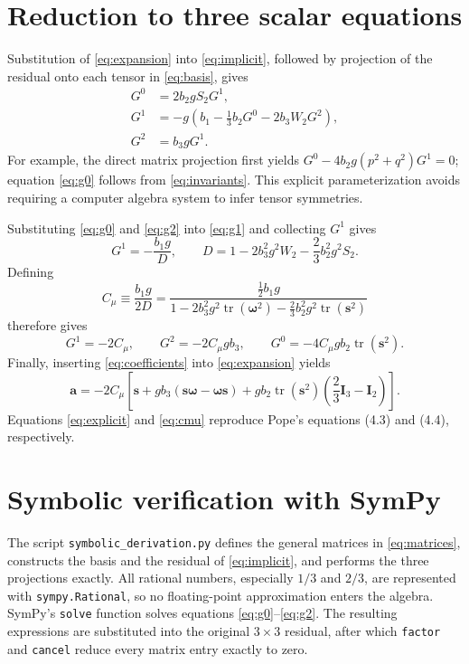 \documentclass[11pt]{article}
\newcommand{\tr}[1]{\operatorname{tr}\!\left(#1\right)}
\newcommand{\bS}{\bm{s}}
\newcommand{\bW}{\bm{\omega}}
\newcommand{\bA}{\bm{a}}
\newcommand{\Ithree}{\bm{I}_3}
\newcommand{\Itwo}{\bm{I}_2}
\begin{document}
\section{Reduction to three scalar equations}
Substitution of \eqref{eq:expansion} into \eqref{eq:implicit}, followed by
projection of the residual onto each tensor in \eqref{eq:basis}, gives
\begin{align}
 G^0 &=2b_2gS_2G^1, \label{eq:g0}\\
 G^1 &=-g\left(b_1-\frac{1}{3}b_2G^0-2b_3W_2G^2\right),
 \label{eq:g1}\\
 G^2 &=b_3gG^1. \label{eq:g2}
\end{align}
For example, the direct matrix projection first yields
$G^0-4b_2g(p^2+q^2)G^1=0$; equation \eqref{eq:g0} follows from
\eqref{eq:invariants}.  This explicit parameterization avoids requiring a
computer algebra system to infer tensor symmetries.

Substituting \eqref{eq:g0} and \eqref{eq:g2} into \eqref{eq:g1} and collecting
$G^1$ gives
\begin{equation}
 G^1=-\frac{b_1g}{D},\qquad
 D=1-2b_3^2g^2W_2-\frac{2}{3}b_2^2g^2S_2.
 \label{eq:denominator}
\end{equation}
Defining
\begin{equation}
 C_\mu\equiv\frac{b_1g}{2D}
 =\frac{\tfrac12b_1g}
 {1-2b_3^2g^2\tr{\bW^2}
 -\tfrac23b_2^2g^2\tr{\bS^2}}
 \label{eq:cmu}
\end{equation}
therefore gives
\begin{equation}
 G^1=-2C_\mu,\qquad
 G^2=-2C_\mu gb_3,\qquad
 G^0=-4C_\mu gb_2\tr{\bS^2}.
 \label{eq:coefficients}
\end{equation}
Finally, inserting \eqref{eq:coefficients} into \eqref{eq:expansion} yields
\begin{equation}
 \boxed{\bA=-2C_\mu\left[\bS+gb_3(\bS\bW-\bW\bS)
 +gb_2\tr{\bS^2}\left(\frac23\Ithree-\Itwo\right)\right].}
 \label{eq:explicit}
\end{equation}
Equations \eqref{eq:explicit} and \eqref{eq:cmu} reproduce Pope's equations
(4.3) and (4.4), respectively.

\section{Symbolic verification with SymPy}
The script \texttt{symbolic\_derivation.py} defines the general matrices in
\eqref{eq:matrices}, constructs the basis and the residual of
\eqref{eq:implicit}, and performs the three projections exactly.  All rational
numbers, especially $1/3$ and $2/3$, are represented with
\texttt{sympy.Rational}, so no floating-point approximation enters the
algebra.  SymPy's \texttt{solve} function solves equations
\eqref{eq:g0}--\eqref{eq:g2}.  The resulting expressions are substituted into
the original $3\times3$ residual, after which \texttt{factor} and
\texttt{cancel} reduce every matrix entry exactly to zero.
\end{document}
